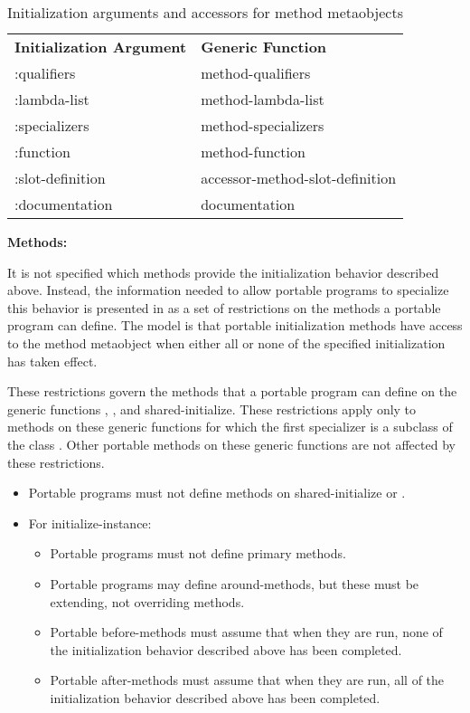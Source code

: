 \begin{table}[t]
\caption{Initialization arguments and accessors for method metaobjects}
\label{INITARGS-ACCESSORS-FOR-METHOD-METAOBJECTS}
\begin{flushleft}
\cf
\begin{tabular}{@{}ll@{}}
\textbf{Initialization Argument}&\textbf{Generic Function}\\
:qualifiers&method-qualifiers\\
:lambda-list&method-lambda-list\\
:specializers&method-specializers\\
:function&method-function\\
:slot-definition&accessor-method-slot-definition\\
:documentation&documentation
\end{tabular}
\end{flushleft}
\end{table}

\textbf{Methods:}

It is not specified which methods provide the initialization behavior described
above. Instead, the information needed to allow portable programs to specialize
this behavior is presented in as a set of restrictions on the methods a portable
program can define. The model is that portable initialization methods have
access to the method metaobject when either all or none of the specified
initialization has taken effect.

These restrictions govern the methods that a portable program can define on the
generic functions , , and
shared-initialize. These restrictions apply only to methods on these generic
functions for which the first specializer is a subclass of the class
. Other portable methods on these generic functions are not affected
by these restrictions.

\begin{itemize}
\item Portable programs must not define methods on shared-initialize or
  .
\item For initialize-instance:
  \begin{itemize}
  \item 
    Portable programs must not define primary methods.
  \item 
    Portable programs may define around-methods, but these must be
    extending, not overriding methods.
  \item 
    Portable before-methods must assume that when they are run, none of the
    initialization behavior described above has been completed.
  \item 
    Portable after-methods must assume that when they are run, all of the
    initialization behavior described above has been completed.
  \end{itemize}
\end{itemize}

